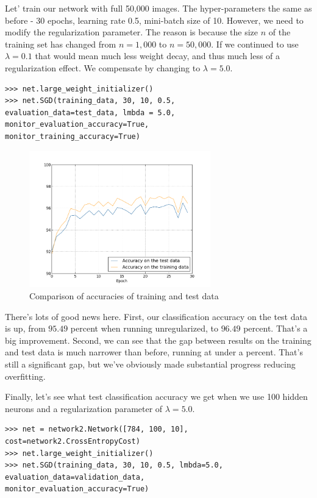 \documentclass[12 pt]{article}
\begin{document}
Let' train our network with full 50,000 images. The hyper-parameters the
same as before - 30 epochs, learning rate 0.5, mini-batch size of 10.
However, we need to modify the regularization parameter. The reason is
because the size $ n $ of the training set has changed from $ n =
1,000 $ to $ n = 50,000 $. If we continued to use $ \lambda = 0.1 $
that would mean much less weight decay, and thus much less of a
regularization effect. We compensate by changing to $ \lambda = 5.0 $.

\begin{verbatim}
>>> net.large_weight_initializer()
>>> net.SGD(training_data, 30, 10, 0.5,
evaluation_data=test_data, lmbda = 5.0,
monitor_evaluation_accuracy=True,
monitor_training_accuracy=True)
\end{verbatim}

\begin{figure}[htp]
\centering
\includegraphics[width=0.7\textwidth]{./figs/regularized_full.png}
\caption{Comparison of accuracies of training and test data}
\end{figure}

There's lots of good news here. First, our classification accuracy on
the test data is up, from $ 95.49 $ percent when running
unregularized, to $ 96.49 $ percent. That's a big improvement. Second,
we can see that the gap between results on the training and test data is
much narrower than before, running at under a percent. That's still a
significant gap, but we've obviously made substantial progress reducing
overfitting.

Finally, let's see what test classification accuracy we get when we use
100 hidden neurons and a regularization parameter of $ \lambda = 5.0
$.

\begin{verbatim}
>>> net = network2.Network([784, 100, 10],
cost=network2.CrossEntropyCost)
>>> net.large_weight_initializer()
>>> net.SGD(training_data, 30, 10, 0.5, lmbda=5.0,
evaluation_data=validation_data,
monitor_evaluation_accuracy=True)
\end{verbatim}
\end{document}
